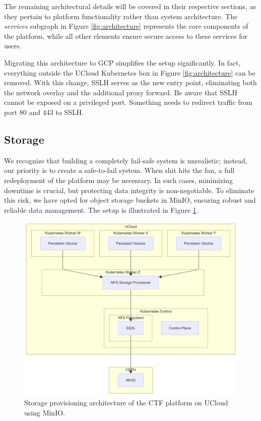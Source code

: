 The remaining architectural details will be covered in their respective sections, as they pertain to platform functionality rather than system architecture. The \textit{services} subgraph in Figure \ref{fig:architecture} represents the core components of the platform, while all other elements ensure secure access to these services for users.

Migrating this architecture to GCP simplifies the setup significantly. In fact, everything outside the UCloud Kubernetes box in Figure \ref{fig:architecture} can be removed. With this change, SSLH serves as the new entry point, eliminating both the network overlay and the additional proxy forward. Be aware that SSLH cannot be exposed on a privileged port. Something needs to redirect traffic from port 80 and 443 to SSLH.

\subsection{Storage}

We recognize that building a completely fail-safe system is unrealistic; instead, our priority is to create a safe-to-fail system. When shit hits the fan, a full redeployment of the platform may be necessary. In such cases, minimizing downtime is crucial, but protecting data integrity is non-negotiable. To eliminate this risk, we have opted for object storage buckets in MinIO, ensuring robust and reliable data management. The setup is illustrated in Figure \ref{fig:storage-provisioning}.

\begin{figure}[h]
    \centering
    \includegraphics[width=1\textwidth]{images/storage-provisioner.png}
    \caption{Storage provisioning architecture of the CTF platform on UCloud using MinIO.}
    \label{fig:storage-provisioning}
\end{figure}

